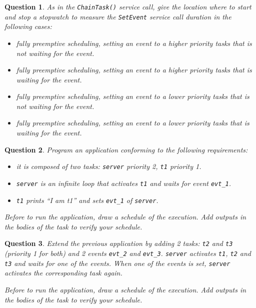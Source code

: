 \documentclass[11pt]{report}
\newtheorem{ex}{Question}
\begin{document}
\begin{ex}
	As in the \lstinline{ChainTask()} service call, give the location where to start and stop a stopwatch to measure the \texttt{SetEvent} service call duration in the following cases:
    \begin{itemize}
        \item fully preemptive scheduling, setting an event to a higher priority tasks that is not waiting for the event.
        \item fully preemptive scheduling, setting an event to a higher priority tasks that is waiting for the event.
        \item fully preemptive scheduling, setting an event to a lower priority tasks that is not waiting for the event.
        \item fully preemptive scheduling, setting an event to a lower priority tasks that is waiting for the event.
    \end{itemize}

\end{ex}

\begin{ex}
Program an application conforming to the following requirements:

\begin{itemize}
    \item it is composed of two tasks: \texttt{server} priority 2, \texttt{t1} priority 1.
    \item \texttt{server} is an infinite loop that activates \texttt{t1} and waits for event \texttt{evt\_1}.
    \item \texttt{t1} prints ``I am t1'' and sets \texttt{evt\_1} of \texttt{server}.
\end{itemize}

Before to run the application, draw a schedule of the execution. Add outputs in the bodies of the task to verify your schedule.
\end{ex}

\begin{ex}
Extend the previous application by adding 2 tasks: \texttt{t2} and \texttt{t3} (priority 1 for both) and 2 events \texttt{evt\_2} and \texttt{evt\_3}. \texttt{server} activates \texttt{t1}, \texttt{t2} and \texttt{t3} and waits for one of the events. When one of the events is set, \texttt{server} activates the corresponding task again.

Before to run the application, draw a schedule of the execution. Add outputs in the bodies of the task to verify your schedule.
\end{ex}
\end{document}

